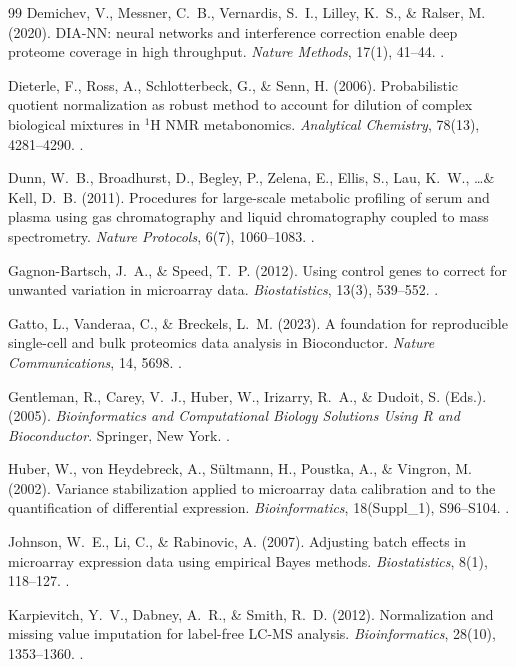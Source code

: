 \documentclass[11pt,oneside]{book}
\begin{document}
\begin{thebibliography}{99}
Demichev, V., Messner, C.~B., Vernardis, S.~I., Lilley, K.~S., \& Ralser, M. (2020). DIA-NN: neural networks and interference correction enable deep proteome coverage in high throughput. \textit{Nature Methods}, 17(1), 41--44. .

Dieterle, F., Ross, A., Schlotterbeck, G., \& Senn, H. (2006). Probabilistic quotient normalization as robust method to account for dilution of complex biological mixtures in $^1$H NMR metabonomics. \textit{Analytical Chemistry}, 78(13), 4281--4290. .

Dunn, W.~B., Broadhurst, D., Begley, P., Zelena, E., Ellis, S., Lau, K.~W., \dots \& Kell, D.~B. (2011). Procedures for large-scale metabolic profiling of serum and plasma using gas chromatography and liquid chromatography coupled to mass spectrometry. \textit{Nature Protocols}, 6(7), 1060--1083. .

Gagnon-Bartsch, J.~A., \& Speed, T.~P. (2012). Using control genes to correct for unwanted variation in microarray data. \textit{Biostatistics}, 13(3), 539--552. .

Gatto, L., Vanderaa, C., \& Breckels, L.~M. (2023). A foundation for reproducible single-cell and bulk proteomics data analysis in Bioconductor. \textit{Nature Communications}, 14, 5698. .

Gentleman, R., Carey, V.~J., Huber, W., Irizarry, R.~A., \& Dudoit, S. (Eds.). (2005). \textit{Bioinformatics and Computational Biology Solutions Using R and Bioconductor}. Springer, New York. .

Huber, W., von Heydebreck, A., S\"ultmann, H., Poustka, A., \& Vingron, M. (2002). Variance stabilization applied to microarray data calibration and to the quantification of differential expression. \textit{Bioinformatics}, 18(Suppl\_1), S96--S104. .

Johnson, W.~E., Li, C., \& Rabinovic, A. (2007). Adjusting batch effects in microarray expression data using empirical Bayes methods. \textit{Biostatistics}, 8(1), 118--127. .

Karpievitch, Y.~V., Dabney, A.~R., \& Smith, R.~D. (2012). Normalization and missing value imputation for label-free LC-MS analysis. \textit{Bioinformatics}, 28(10), 1353--1360. .


\end{thebibliography}
\end{document}
